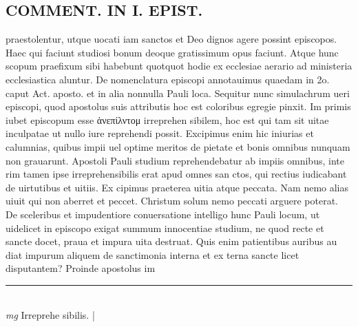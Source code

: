\documentclass{article}
\begin{document}
\begin{pages}
\section*{COMMENT. IN I. EPIST. }\pstart praestolentur, utque uocati iam sanctos et Deo dignos agere possint episcopos. Haec qui faciunt studiosi bonum deoque gratissimum opus faciunt. Atque hunc scopum praefixum sibi habebunt quotquot hodie ex ecclesiae aerario ad ministeria ecclesiastica aluntur. De nomenclatura episcopi annotauimus quaedam in 2o. caput Act. aposto. et in alia nonnulla Pauli loca. Sequitur nunc simulachrum ueri episcopi, quod apostolus suis attributis hoc est coloribus egregie pinxit. Im primis iubet episcopum esse ἀνεπίλντομ irreprehen sibilem, hoc est qui tam sit uitae inculpatae ut nullo iure reprehendi possit. Excipimus enim hic iniurias et calumnias, quibus impii uel optime meritos de pietate et bonis omnibus nunquam non grauarunt. Apostoli Pauli studium reprehendebatur ab impiis omnibus, inte rim tamen ipse irreprehensibilis erat apud omnes san ctos, qui rectius iudicabant de uirtutibus et uitiis. Ex cipimus praeterea uitia atque peccata. Nam nemo alias uiuit qui non aberret et peccet. Christum solum nemo peccati arguere poterat. De sceleribus et impudentiore conuersatione intelligo hunc Pauli locum, ut uidelicet in episcopo exigat summum innocentiae studium, ne quod recte et sancte docet, praua et impura uita destruat. Quis enim patientibus auribus au diat impurum aliquem de sanctimonia interna et ex terna sancte licet disputantem? Proinde apostolus im  \pend
\vspace{0.5cm}\noindent
\vspace{0.2cm}\rule{1cm}{0.2pt}\\ 
\hspace{0.2cm}\textit{mg}
\footnotesize Irreprehe sibilis. 
\normalsize| 

\end{pages}
\end{document}

